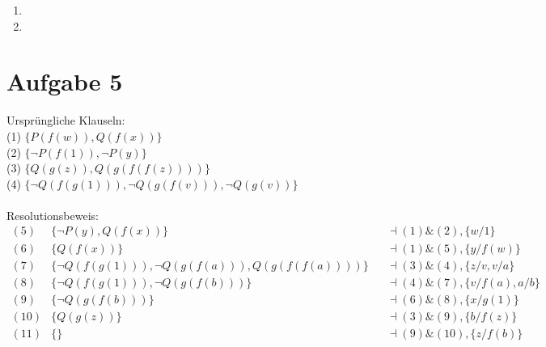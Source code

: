 \documentclass[a4paper,10pt]{article}
\begin{document}
\begin{enumerate}[~~a)]
    \item

    \item
\end{enumerate}

\section*{Aufgabe 5}
Ursprüngliche Klauseln:\\
(1) $\{P(f(w)), Q(f(x))\}$\\
(2) $\{ \lnot P(f(1)), \lnot P(y) \}$\\
(3) $\{Q(g(z)), Q(g(f(f(z))))\}$\\
(4) $\{\lnot Q(f(g(1))), \lnot Q(g(f(v))), \lnot Q(g(v))\}$\\
\\
Resolutionsbeweis:\\
\begin{align*}
(5) &\{\lnot P(y), Q(f(x))\} &&\dashv (1) \& (2), \{w/1\}\\
(6) &\{Q(f(x))\} &&\dashv (1) \& (5), \{y/f(w)\}\\
(7) &\{\lnot Q(f(g(1))), \lnot Q(g(f(a))), Q(g(f(f(a))))\} &&\dashv (3) \& 		(4), \{z/v,v/a\}\\
(8) &\{\lnot Q(f(g(1))), \lnot Q(g(f(b)))\} &&\dashv (4) \& (7), \{v/f(a), 		a/b\}\\
(9) &\{\lnot Q(g(f(b)))\} &&\dashv (6) \& (8), \{x/g(1)\}\\
(10) &\{Q(g(z))\} &&\dashv (3) \& (9), \{b/f(z)\}\\
(11) &\{\} &&\dashv (9) \& (10), \{z/f(b)\}\\
\end{align*}
\end{document}

